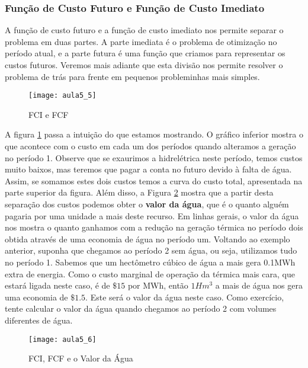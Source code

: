 \subsubsection{Função de Custo Futuro e Função de Custo Imediato}

A função de custo futuro e a função de custo imediato nos permite separar o problema em duas partes. A parte imediata é o problema de otimização no período atual, e a parte futura é uma função que criamos para representar os custos futuros. Veremos mais adiante que esta divisão nos permite resolver o problema de trás para frente em pequenos probleminhas mais simples. 

\begin{figure}[H]
\begin{centering}
\texttt{[image: aula5\_5]}\protect\caption{\label{fig:fcifcf} FCI e FCF}
\end{centering}
\end{figure}


A figura \ref{fig:fcifcf} passa a intuição do que estamos mostrando. O gráfico inferior mostra o que acontece com o custo em cada um dos períodos quando alteramos a geração no período 1. Observe que se exaurimos a hidrelétrica neste período, temos custos muito baixos, mas teremos que pagar a conta no futuro devido à falta de água. Assim, se somamos estes dois custos temos a curva do custo total, apresentada na parte superior da figura. Além disso, a Figura \ref{fig:fcifcf1} mostra que a partir desta separação dos custos podemos obter o \textbf{valor da água}, que é o quanto alguém pagaria por uma unidade a mais deste recurso. Em linhas gerais, o valor da água nos mostra o quanto ganhamos com a redução na geração térmica no período dois obtida através de uma economia de água no período um. Voltando ao exemplo anterior, suponha que chegamos ao período 2 sem água, ou seja, utilizamos tudo no período 1. Sabemos que um hectômetro cúbico de água a mais gera 0.1MWh extra de energia. Como o custo marginal de operação da térmica mais cara, que estará ligada neste caso, é de $\$15$ por MWh, então $1Hm^3$ a mais de água nos gera uma economia de $\$1.5$. Este será o valor da água neste caso. Como exercício, tente calcular o valor da água quando chegamos ao período 2 com volumes diferentes de água. 

\begin{figure}[H]
\begin{centering}
\texttt{[image: aula5\_6]}\protect\caption{\label{fig:fcifcf1} FCI, FCF e o Valor da Água} 
\end{centering}
\end{figure}

